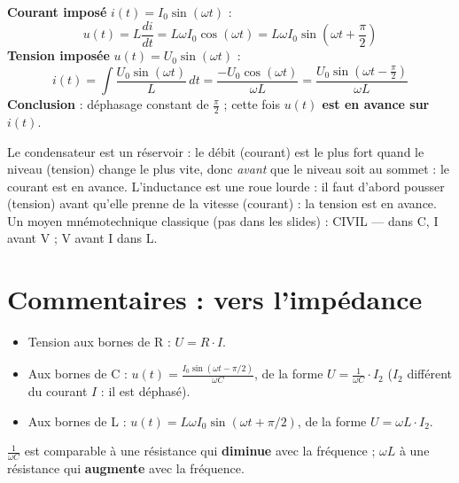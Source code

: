 
\begin{thmbox}[title=Inductance en sinusoïdal]
\textbf{Courant imposé} $i(t) = I_0\sin(\omega t)$ :
\[ u(t) = L\frac{di}{dt} = L\omega I_0\cos(\omega t) = L\omega I_0\sin\!\left(\omega t + \frac\pi2\right) \]
\textbf{Tension imposée} $u(t) = U_0\sin(\omega t)$ :
\[ i(t) = \int\frac{U_0\sin(\omega t)}{L}\,dt = \frac{-U_0\cos(\omega t)}{\omega L}
   = \frac{U_0\sin(\omega t - \frac\pi2)}{\omega L} \]
\textbf{Conclusion} : déphasage constant de $\frac\pi2$ ; cette fois \textbf{$u(t)$ est en
avance sur $i(t)$}.
\end{thmbox}

\begin{goatbox}
Le condensateur est un réservoir : le débit (courant) est le plus fort quand le niveau
(tension) change le plus vite, donc \emph{avant} que le niveau soit au sommet : le courant
est en avance. L'inductance est une roue lourde : il faut d'abord pousser (tension) avant
qu'elle prenne de la vitesse (courant) : la tension est en avance. Un moyen mnémotechnique
classique (pas dans les slides) : \og CIVIL\fg{} --- dans C, I avant V ; V avant I dans L.
\end{goatbox}

\section{Commentaires : vers l'impédance}


\begin{propbox}[title=Constat]
\begin{itemize}
  \item Tension aux bornes de R : $U = R\cdot I$.
  \item Aux bornes de C : $u(t) = \frac{I_0\sin(\omega t - \pi/2)}{\omega C}$, de la forme
        $U = \frac{1}{\omega C}\cdot I_2$ ($I_2$ différent du courant $I$ : il est déphasé).
  \item Aux bornes de L : $u(t) = L\omega I_0\sin(\omega t + \pi/2)$, de la forme
        $U = \omega L\cdot I_2$.
\end{itemize}
$\frac1{\omega C}$ est comparable à une résistance qui \textbf{diminue} avec la fréquence ;
$\omega L$ à une résistance qui \textbf{augmente} avec la fréquence.
\end{propbox}

